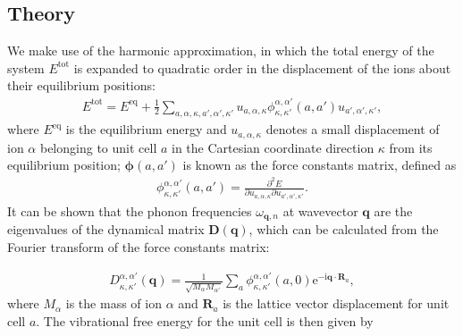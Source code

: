 \documentclass[letterpaper,10pt,english]{sphinxmanual}
\begin{document}
\subsection{Theory}
\label{\detokenize{phonons:theory}}
We make use of the harmonic approximation, in which the total energy of
the system \(E^\mathrm{tot}\) is expanded to quadratic order in the
displacement of the ions about their equilibrium positions:
\begin{equation*}
\begin{split}E^\mathrm{tot} = E^\mathrm{eq} + \frac{1}{2} \sum_{a,\alpha,\kappa,a',\alpha',\kappa'} u_{a,\alpha,\kappa} \phi_{\kappa,\kappa'}^{\alpha,\alpha'} \left ( a,a' \right ) u_{a',\alpha',\kappa'},\end{split}
\end{equation*}
where \(E^\mathrm{eq}\) is the equilibrium energy and
\(u_{a,\alpha,\kappa}\) denotes a small displacement of ion
\(\alpha\) belonging to unit cell \(a\) in the Cartesian
coordinate direction \(\kappa\) from its equilibrium position;
\(\boldsymbol{\phi} \left ( a,a' \right )\) is known as the force
constants matrix, defined as
\begin{equation*}
\begin{split}\phi_{\kappa,\kappa'}^{\alpha,\alpha'} \left ( a,a' \right ) = \frac{\partial^2 E}{\partial u_{a,\alpha,\kappa} \partial u_{a',\alpha',\kappa'}}.\end{split}
\end{equation*}
It can be shown that the phonon frequencies
\(\omega_{\mathbf{q},n}\) at wavevector \(\mathbf{q}\) are the
eigenvalues of the dynamical matrix
\(\mathbf{D} \left ( \mathbf{q} \right )\), which can be calculated
from the Fourier transform of the force constants matrix:

\label{\detokenize{phonons:equation-dynamical-mat}}\begin{equation}\label{equation:phonons:dynamical_mat}
\begin{split}D_{\kappa,\kappa'}^{\alpha,\alpha'} \left ( \mathbf{q} \right ) = \frac{1}{\sqrt{M_\alpha M_{\alpha'}}} \sum_a \phi_{\kappa,\kappa'}^{\alpha,\alpha'} \left ( a,0 \right ) \mathrm{e}^{-\mathrm{i} \mathbf{q} \cdot \mathbf{R}_a},\end{split}
\end{equation}
where \(M_\alpha\) is the mass of ion \(\alpha\) and
\(\mathbf{R}_a\) is the lattice vector displacement for unit cell
\(a\). The vibrational free energy for the unit cell is then given
by
\end{document}
